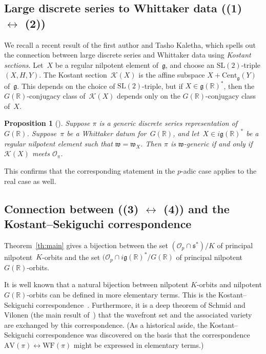 \documentclass[10pt,leqno]{article}
\newtheorem{proposition}[equation]{Proposition}
\renewcommand{\O}{\mathcal O}
\newcommand{\R}{\mathbb R}
\newcommand{\g}{\mathfrak g}
\newcommand{\SL}{\text{SL}}
\newcommand{\s}{\mathfrak s}
\newcommand{\w}{\mathfrak w}
\newcommand{\AV}{\mathrm{AV}}
\newcommand{\WF}{\mathrm{WF}}
\newcommand{\Op}{\O_p}
\newcommand{\Kostant}[1]{\mathcal{K}(#1)}
\begin{document}
\subsection{Large discrete series to Whittaker data ((1) $\leftrightarrow$ (2))}


We recall a recent result of the first author and Tasho Kaletha, which spells out the connection between large discrete series and Whittaker data using  {\it Kostant sections}. Let~$X$ be a regular nilpotent element of~$\g$, and choose an  $\SL(2)$-triple $(X, H, Y)$. The Kostant section~$\Kostant{X}$ is the affine subspace $X + \mathrm{Cent}_{\g}(Y)$ of~$\g$. This depends on the choice of $\SL(2)$-triple, but if $X \in \g(\R)^*$, then the $G(\R)$-conjugacy class of~$\Kostant{X}$ depends only on the $G(\R)$-conjugacy class of~$X$. 


\begin{proposition}[\cite{adams_kaletha}]\label{JeffTasho_criterion}
Suppose $\pi$ is a generic discrete series representation of~$G(\R)$. Suppose~$\pi$ be a Whittaker datum for~$G(\R)$, and let~$X \in i\g(\R)^*$ be a regular nilpotent element such that $\w = \w_X$. 
Then $\pi$ is $\w$-generic if and only if $\Kostant{X}$ meets $\mathcal{O}_\pi$. 
\end{proposition}


This confirms that  the corresponding statement  in the $p$-adic case \cite{debacker_reeder_generic, kaletha_epipelagic}
applies to the real case as well.


\subsection{Connection between ((3) $\leftrightarrow$ (4)) and the Kostant--Sekiguchi correspondence } 

Theorem~\ref{th:main} gives a bijection between the set $(\Op \cap \s^*)/K$ of principal nilpotent~$K$-orbits and the set $(\Op \cap i\g(\R)^*/G(\R)$ of principal nilpotent~$G(\R)$-orbits. 

It is well known that a natural bijection between nilpotent $K$-orbits and nilpotent $G(\R)$-orbits can be defined in more elementary terms. This is the Kostant--Sekiguchi correspondence~\cite{sekiguchi}. Furthermore, it is a deep theorem of Schmid and Vilonen (the main result of~\cite{SV1}) that the wavefront set and the associated variety are exchanged by this correspondence. (As a historical aside, the Kostant--Sekiguchi correspondence was discovered on the basis that the correspondence $\AV(\pi) \leftrightarrow \WF(\pi)$ might be expressed in elementary terms.)
\end{document}
